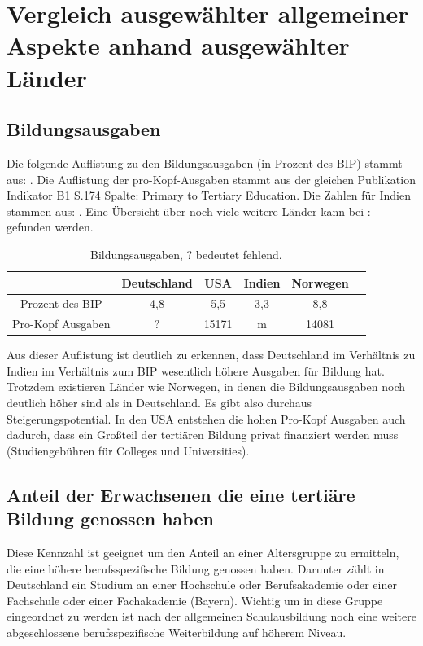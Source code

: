 \section{Vergleich ausgewählter allgemeiner Aspekte anhand ausgewählter Länder}

\subsection*{Bildungsausgaben}
Die folgende Auflistung zu den Bildungsausgaben (in Prozent des BIP) stammt aus: \cite[Indikator B4. S.219]{oecd5}. 
Die Auflistung der pro-Kopf-Ausgaben stammt aus der gleichen Publikation Indikator B1 S.174 Spalte: Primary to Tertiary Education.
Die Zahlen für Indien stammen aus: \cite[2]{oester}. Eine Übersicht über noch viele weitere Länder kann bei : \cite[165]{hdr} gefunden werden.

\begin{table}[htp]
\begin{tabular}{|c|c|c|c|c|c|}
\hline  	& Deutschland & USA & Indien  & Norwegen \\ 
\hline 	Prozent des BIP &4,8 & 5,5  & 3,3  & 8,8 \\ 
\hline  Pro-Kopf Ausgaben & ? & 15171 & m & 14081 \\ 
\hline 
\end{tabular} 
\caption{Bildungsausgaben, ? bedeutet fehlend.}
\end{table}
Aus dieser Auflistung ist deutlich zu erkennen, dass Deutschland im Verhältnis zu Indien im Verhältnis zum BIP wesentlich höhere Ausgaben für Bildung hat. Trotzdem existieren Länder wie Norwegen, in denen die Bildungsausgaben noch deutlich höher sind als in Deutschland. Es gibt also durchaus Steigerungspotential. In den USA entstehen die hohen Pro-Kopf Ausgaben auch dadurch, dass ein Großteil der tertiären Bildung privat finanziert werden muss (Studiengebühren für Colleges und Universities). 

\subsection*{Anteil der Erwachsenen die eine tertiäre Bildung genossen haben}
Diese Kennzahl ist geeignet um den Anteil an einer Altersgruppe zu ermitteln, die eine höhere berufsspezifische Bildung genossen haben. Darunter zählt in Deutschland ein Studium an einer Hochschule oder Berufsakademie oder einer Fachschule oder einer Fachakademie (Bayern). Wichtig um in diese Gruppe eingeordnet zu werden ist nach der allgemeinen Schulausbildung noch eine weitere abgeschlossene berufsspezifische Weiterbildung auf höherem Niveau.

